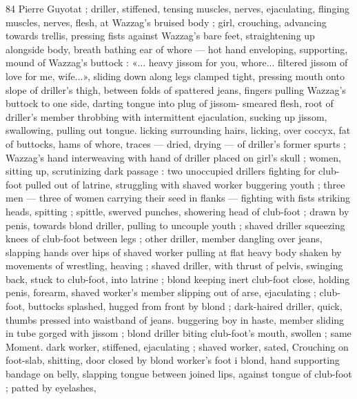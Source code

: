 84 Pierre Guyotat
; driller, stiffened, tensing muscles, nerves, ejaculating, flinging
muscles, nerves, flesh, at Wazzag's bruised body ; girl, crouching,
advancing towards trellis, pressing fists against Wazzag's bare feet,
straightening up alongside body, breath bathing ear of whore — hot
hand enveloping, supporting, mound of Wazzag’s buttock : «... heavy
jissom for you, whore... filtered jissom of love for me, wife...», sliding
down along legs clamped tight, pressing mouth onto slope of
driller's thigh, between folds of spattered jeans, fingers pulling
Wazzag's buttock to one side, darting tongue into plug of jissom-
smeared flesh, root of driller's member throbbing with intermittent
ejaculation, sucking up jissom, swallowing, pulling out tongue. licking
surrounding hairs, licking, over coccyx, fat of buttocks, hams of
whore, traces — dried, drying — of driller's former spurts ;
Wazzag's hand interweaving with hand of driller placed on girl's skull
; women, sitting up, scrutinizing dark passage : two unoccupied
drillers fighting for club-foot pulled out of latrine, struggling with
shaved worker buggering youth ; three men — three of women
carrying their seed in flanks — fighting with fists striking heads,
spitting ; spittle, swerved punches, showering head of club-foot ;
drawn by penis, towards blond driller, pulling to uncouple youth ;
shaved driller squeezing knees of club-foot between legs ; other
driller, member dangling over jeans, slapping hands over hips of
shaved worker pulling at flat heavy body shaken by movements of
wrestling, heaving ; shaved driller, with thrust of pelvis, swinging
back, stuck to club-foot, into latrine ; blond keeping inert club-foot
close, holding penis, forearm, shaved worker's member slipping out
of arse, ejaculating ; club-foot, buttocks splashed, hugged from front
by blond ; dark-haired driller, quick, thumbs pressed into waistband
of jeans. buggering boy in haste, member sliding in tube gorged with
jissom ; blond driller biting club-foot's mouth, swollen ; same
Moment. dark worker, stiffened, ejaculating ; shaved worker, sated,
Crouching on foot-slab, shitting, door closed by blond worker's foot
i blond, hand supporting bandage on belly, slapping tongue between
joined lips, against tongue of club-foot ; patted by eyelashes,

